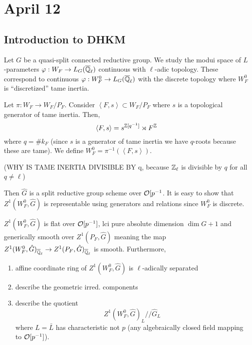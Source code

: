 \documentclass[12pt]{article}
\begin{document}
\section{April 12}

\subsection{Introduction to DHKM}

Let $G$ be a quasi-split connected reductive group. We study the modui space of $L$-parameters $\varphi : W_F \to L_G(\overline{\mathbb{Q}}_\ell)$ continuous with $\ell$-adic topology. These correspond to continuous $\varphi : W_F^0 \to L_G(\overline{\mathbb{Q}}_\ell)$ with the discrete topology where $W_F^0$ is ``discretized'' tame inertia.

\begin{defn}
Let $\pi : W_F \to W_F / P_F$. Consider $\left< F, s \right> \subset W_F / P_F$ where $s$ is a topological generator of tame inertia. Then,
\[ \left< F, s \right> = s^{\mathbb{Z}[q^{-1}]} \rtimes F^{\mathbb{Z}} \]
where $q = \# k_F$ (since $s$ is a generator of tame inertia we have $q$-roots because these are tame). We define $W_F^0 = \pi^{-1}(\left< F, s \right>)$. 
\end{defn}

(WHY IS TAME INERTIA DIVISIBLE BY q, because $\mathbb{Z}_\ell$ is divisible by $q$ for all $q \neq \ell$)

Then $\hat{G}$ is a split reductive group scheme over $\mathcal{O}[p^{-1}$. 
It is easy to show that $Z^1(W_F^0, \hat{G})$ is representable using generators and relations since $W_F^0$ is discrete. 

\begin{thm}
$Z^1(W_F^0, \hat{G})$ is flat over $\mathcal{O}[p^{-1}]$, lci pure absolute dimension $\dim{\hat{G}} + 1$ and generically smooth over $Z^1(P_F, \hat{G})$ meaning the map $Z^1(W_F^0, \hat{G})_{\overline{\mathbb{Q}}_\ell} \to Z^1(P_F, \hat{G})_{\overline{\mathbb{Q}}_\ell}$ is smooth. Furthermore,
\begin{enumerate}
\item affine coordinate ring of $Z^1(W_F^0, \hat{G})$ is $\ell$-adically separated
\item describe the geometric irred. components 
\item describe the quotient
\[ Z^1(W_F^0, \hat{G})_L // \hat{G}_L \]
where $L = \bar{L}$ has characteristic not $p$ (any algebraically closed field mapping to $\mathcal{O}[p^{-1}]$). 
\end{enumerate}
\end{thm}
\end{document}

